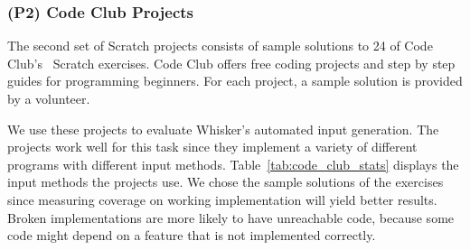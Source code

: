 \subsubsection{(P2) Code Club Projects}

The second set of Scratch projects consists of sample solutions to 24 of Code Club's~\cite{codeclub} Scratch exercises.
Code Club offers free coding projects and step by step guides for programming beginners.
For each project, a sample solution is provided by a volunteer.
\parspace

We use these projects to evaluate Whisker's automated input generation.
The projects work well for this task since they implement a variety of different programs with different input methods.
Table~\ref{tab:code_club_stats} displays the input methods the projects use.
We chose the sample solutions of the exercises since measuring coverage on working implementation will yield better results.
Broken implementations are more likely to have unreachable code,
because some code might depend on a feature that is not implemented correctly.

